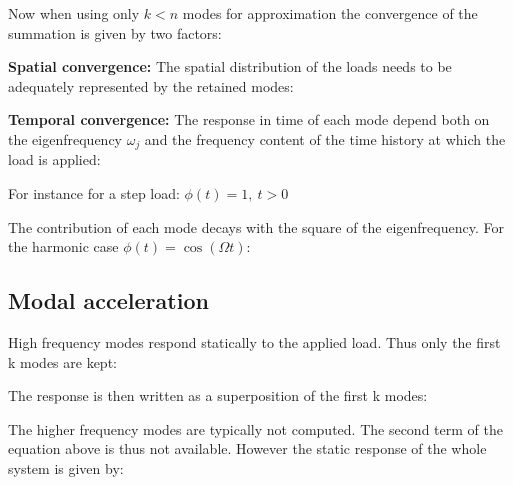 \documentclass[10pt,a4paper]{scrartcl}
\begin{document}
\begin{multicols*}{2}
Now when using only $k<n$ modes for approximation the convergence of the summation is given by two factors:

\vspace{3ex}

\textbf{Spatial convergence:} The spatial distribution of the loads needs to be adequately represented by the retained modes:


\textbf{Temporal convergence:} The response in time of each mode depend both on the eigenfrequency $\omega_j$ and the frequency content of the time history at which the load is applied:


For instance for a step load: $\phi(t)=1,\ t>0$


The contribution of each mode decays with the square of the eigenfrequency. For the harmonic case $\phi(t)=\cos(\Omega t)$:


\subsection{Modal acceleration}

High frequency modes respond statically to the applied load. Thus only the first k modes are kept:


The response is then written as a superposition of the first k modes:


The higher frequency modes are typically not computed. The second term of the equation above is thus not available. However the static response of the whole system is given by:



\end{multicols*}
\end{document}
